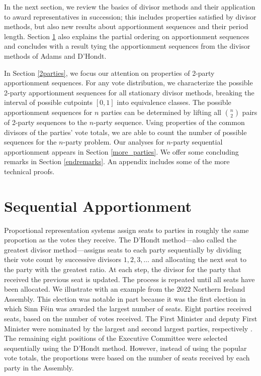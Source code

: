 \documentclass[pdflatex,sn-mathphys-num]{sn-jnl}
\theoremstyle{thmstyleone}%
\theoremstyle{thmstyletwo}%
\theoremstyle{thmstylethree}%
\begin{document}
In the next section, we review the basics of divisor methods and their application to award representatives in succession; this includes properties satisfied by divisor methods, but also new results about apportionment sequences and their period length.  Section \ref{prelims} also explains the partial ordering on apportionment sequences and concludes with a result tying the apportionment sequences from the divisor methods of Adams and D'Hondt.

In Section \ref{2parties}, we focus our attention on properties of 2-party apportionment sequences.  For any vote distribution, we characterize the possible 2-party apportionment sequences for all stationary divisor methods, breaking the interval of possible cutpoints $[0,1]$ into equivalence classes. The possible apportionment sequences for $n$ parties can be determined by lifting all $\binom{n}{2}$ pairs of 2-party sequences to the $n$-party sequence.  Using properties of the common divisors of the parties' vote totals, we are able to count the number of possible sequences for the $n$-party problem.  Our analyses for $n$-party sequential apportionment appears in  Section \ref{more_parties}. We offer some concluding remarks in Section \ref{endremarks}.  An appendix includes some of the more technical proofs.


\section{Sequential Apportionment}\label{prelims}

Proportional representation systems assign seats to parties in roughly the same proportion as the votes they receive.  The D'Hondt method---also called the greatest divisor method---assigns seats to each party sequentially by dividing their vote count by successive divisors $1, 2, 3, \dots$ and allocating the next seat to the party with the greatest ratio. At each step, the divisor for the party that received the previous seat is updated. The process is repeated  until all seats have been allocated. We illustrate with an example from the 2022 Northern Ireland Assembly. This election was notable in part because it was the first election in which Sinn F\'ein was awarded the largest number of seats.  Eight parties received seats, based on the number of votes received. The First Minister and deputy First Minister were nominated by the largest and second largest parties, respectively \cite{Education}. The remaining eight positions of the Executive Committee were selected sequentially using the D'Hondt method. However, instead of using the popular vote totals, the proportions were based on the number of seats received by each party in the Assembly. 
\end{document}
